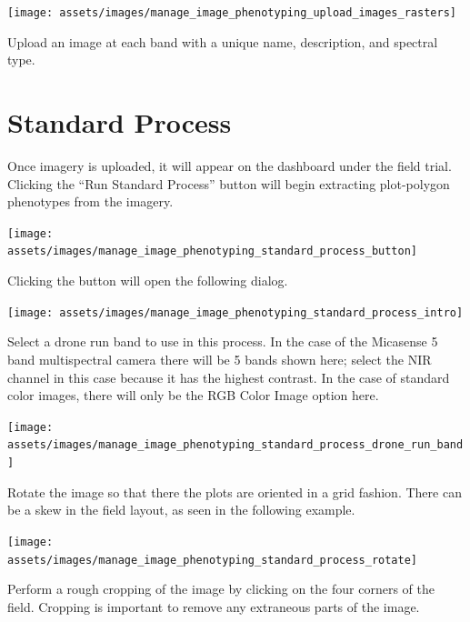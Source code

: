 \documentclass[
  12pt,
]{book}
\begin{document}
\begin{center}\texttt{[image: assets/images/manage\_image\_phenotyping\_upload\_images\_rasters]} \end{center}

Upload an image at each band with a unique name, description, and spectral type.

\hypertarget{standard-process}{%
\section{Standard Process}\label{standard-process}}

Once imagery is uploaded, it will appear on the dashboard under the field trial. Clicking the ``Run Standard Process'' button will begin extracting plot-polygon phenotypes from the imagery.

\begin{center}\texttt{[image: assets/images/manage\_image\_phenotyping\_standard\_process\_button]} \end{center}

Clicking the button will open the following dialog.

\begin{center}\texttt{[image: assets/images/manage\_image\_phenotyping\_standard\_process\_intro]} \end{center}

Select a drone run band to use in this process. In the case of the Micasense 5 band multispectral camera there will be 5 bands shown here; select the NIR channel in this case because it has the highest contrast. In the case of standard color images, there will only be the RGB Color Image option here.

\begin{center}\texttt{[image: assets/images/manage\_image\_phenotyping\_standard\_process\_drone\_run\_band]} \end{center}

Rotate the image so that there the plots are oriented in a grid fashion. There can be a skew in the field layout, as seen in the following example.

\begin{center}\texttt{[image: assets/images/manage\_image\_phenotyping\_standard\_process\_rotate]} \end{center}

Perform a rough cropping of the image by clicking on the four corners of the field. Cropping is important to remove any extraneous parts of the image.
\end{document}
